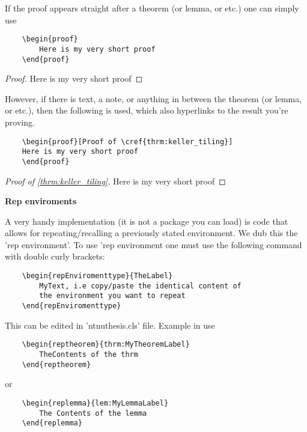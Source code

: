 \documentclass[../thesis.tex]{subfiles}
\begin{document}
If the proof appears straight after a theorem (or lemma, or etc.) one can simply use 
\begin{verbatim}
    \begin{proof}
        Here is my very short proof
    \end{proof}
\end{verbatim}
\begin{proof}
    Here is my very short proof
\end{proof}
However, if there is text, a note, or anything in between the theorem (or lemma, or etc.), then the following is used, which also hyperlinks to the result you're proving. 
\begin{verbatim}
    \begin{proof}[Proof of \cref{thrm:keller_tiling}]
    Here is my very short proof
    \end{proof}
\end{verbatim}
\begin{proof}[Proof of \cref{thrm:keller_tiling}]
    Here is my very short proof
\end{proof}


\textbf{Rep enviroments}

A very handy implementation (it is not a package you can load) is code that allows for repeating/recalling a previously stated environment. We dub this the 'rep environment'. To use 'rep environment one must use the following command with double curly brackets: 
\begin{verbatim}
    \begin{repEnviromenttype}{TheLabel}
        MyText, i.e copy/paste the identical content of 
        the environment you want to repeat
    \end{repEnviromenttype}
\end{verbatim}
This can be edited in 'ntnuthesis.cls' file. Example in use 
\begin{verbatim}
    \begin{reptheorem}{thrm:MyTheoremLabel}
        TheContents of the thrm 
    \end{reptheorem}
\end{verbatim}
or
\begin{verbatim}
    \begin{replemma}{lem:MyLemmaLabel}
        The Contents of the lemma
    \end{replemma}
\end{verbatim}
\end{document}
